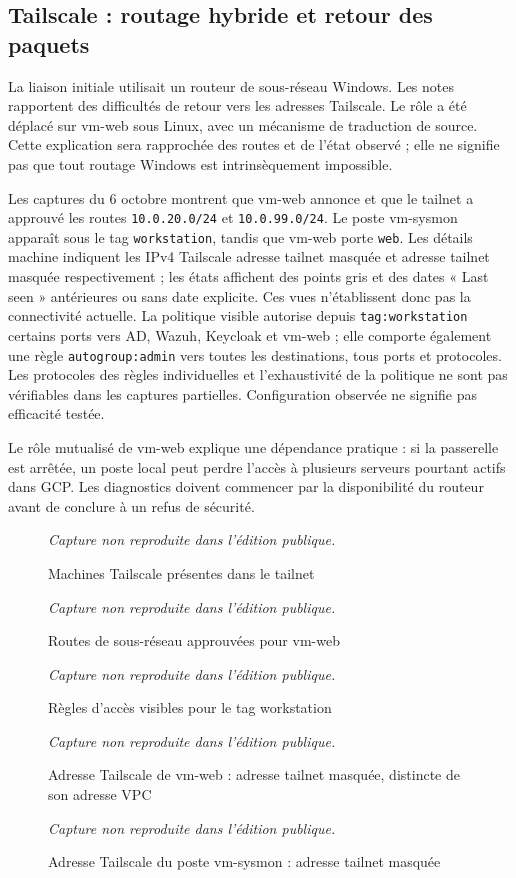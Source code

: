 \documentclass[a4paper,12pt]{report}
\newcommand{\publiccapture}[1]{%
  \begin{figure}[H]\centering
  {\footnotesize\itshape Capture non reproduite dans l'édition publique.}
  \caption{#1}\end{figure}}
\begin{document}
\subsection{Tailscale : routage hybride et retour des paquets}
La liaison initiale utilisait un routeur de sous-réseau Windows. Les notes rapportent des difficultés de retour vers les adresses Tailscale. Le rôle a été déplacé sur vm-web sous Linux, avec un mécanisme de traduction de source. Cette explication sera rapprochée des routes et de l'état observé ; elle ne signifie pas que tout routage Windows est intrinsèquement impossible.

Les captures du 6 octobre montrent que vm-web annonce et que le tailnet a approuvé les routes \texttt{10.0.20.0/24} et \texttt{10.0.99.0/24}. Le poste vm-sysmon apparaît sous le tag \texttt{workstation}, tandis que vm-web porte \texttt{web}. Les détails machine indiquent les IPv4 Tailscale adresse tailnet masquée et adresse tailnet masquée respectivement ; les états affichent des points gris et des dates « Last seen » antérieures ou sans date explicite. Ces vues n'établissent donc pas la connectivité actuelle. La politique visible autorise depuis \texttt{tag:workstation} certains ports vers AD, Wazuh, Keycloak et vm-web ; elle comporte également une règle \texttt{autogroup:admin} vers toutes les destinations, tous ports et protocoles. Les protocoles des règles individuelles et l'exhaustivité de la politique ne sont pas vérifiables dans les captures partielles. Configuration observée ne signifie pas efficacité testée.

Le rôle mutualisé de vm-web explique une dépendance pratique : si la passerelle est arrêtée, un poste local peut perdre l'accès à plusieurs serveurs pourtant actifs dans GCP. Les diagnostics doivent commencer par la disponibilité du routeur avant de conclure à un refus de sécurité.
\publiccapture{Machines Tailscale présentes dans le tailnet}
\publiccapture{Routes de sous-réseau approuvées pour vm-web}
\publiccapture{Règles d'accès visibles pour le tag workstation}
\publiccapture{Adresse Tailscale de vm-web : adresse tailnet masquée, distincte de son adresse VPC}
\publiccapture{Adresse Tailscale du poste vm-sysmon : adresse tailnet masquée}
\end{document}
